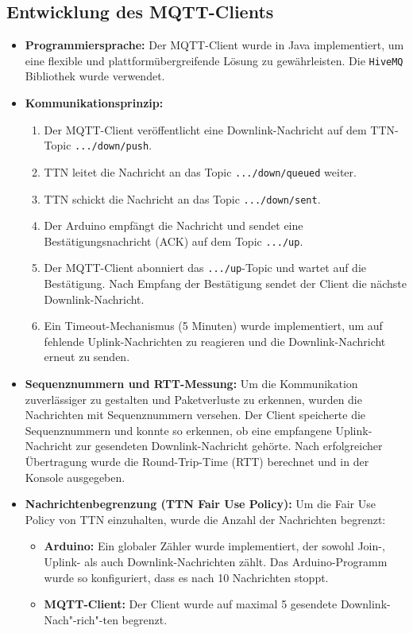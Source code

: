 \documentclass[12pt,a4paper]{article}
\begin{document}
\subsection{Entwicklung des MQTT-Clients}

\begin{itemize}
    \item \textbf{Programmiersprache:} Der MQTT-Client wurde in Java implementiert, um eine flexible und plattformübergreifende Lösung zu gewährleisten.  Die \texttt{HiveMQ} Bibliothek wurde verwendet.
    \item \textbf{Kommunikationsprinzip:}
    \begin{enumerate}
        \item Der MQTT-Client veröffentlicht eine Downlink-Nachricht auf dem TTN-Topic \texttt{.../down/push}.
        \item TTN leitet die Nachricht an das Topic \texttt{.../down/queued} weiter.
        \item TTN schickt die Nachricht an das Topic \texttt{.../down/sent}.
        \item Der Arduino empfängt die Nachricht und sendet eine Bestätigungsnachricht (ACK) auf dem Topic \texttt{.../up}.
        \item Der MQTT-Client abonniert das \texttt{.../up}-Topic und wartet auf die Bestätigung. Nach Empfang der Bestätigung sendet der Client die nächste Downlink-Nachricht.
        \item Ein Timeout-Mechanismus (5 Minuten) wurde implementiert, um auf fehlende Uplink-Nachrichten zu reagieren und die Downlink-Nachricht erneut zu senden.
    \end{enumerate}
    \item \textbf{Sequenznummern und RTT-Messung:}  Um die Kommunikation zuverlässiger zu gestalten und Paketverluste zu erkennen, wurden die Nachrichten mit Sequenznummern versehen. Der Client speicherte die Sequenznummern und konnte so erkennen, ob eine empfangene Uplink-Nachricht zur gesendeten Downlink-Nachricht gehörte. Nach erfolgreicher Übertragung wurde die Round-Trip-Time (RTT) berechnet und in der Konsole ausgegeben.

    \item \textbf{Nachrichtenbegrenzung (TTN Fair Use Policy):}  Um die Fair Use Policy von TTN einzuhalten, wurde die Anzahl der Nachrichten begrenzt:
    \begin{itemize}
        \item \textbf{Arduino:} Ein globaler Zähler wurde implementiert, der sowohl Join-, Uplink- als auch Downlink-Nachrichten zählt. Das Arduino-Programm wurde so konfiguriert, dass es nach 10 Nachrichten stoppt.
        \item \textbf{MQTT-Client:} Der Client wurde auf maximal 5 gesendete Downlink-Nach"-rich"-ten begrenzt.
    \end{itemize}
\end{itemize}
\end{document}
